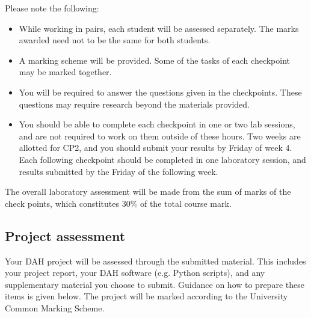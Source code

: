 Please note the following:
\begin{itemize}
\item While working in pairs, each student will be assessed separately. The marks awarded need not to be the same for both students. 
\item A marking scheme will be provided. Some of the tasks of each checkpoint may be marked together.
\item You will be required to answer the questions given in the checkpoints. These questions may require research beyond the materials provided.
\item You should be able to complete each checkpoint in one or two lab sessions, and are not required to work on them outside of these hours. Two weeks are allotted for CP2, and you should submit your results by Friday of week 4. Each following checkpoint should be completed in one laboratory session, and results submitted by the Friday of the following week.
\end{itemize}

The overall laboratory assessment will be made from the sum of marks of the check points, which constitutes 30\% of the total course mark.

\subsection{Project assessment}

Your DAH project will be assessed through the submitted material.
This includes your project report, your DAH software (e.g. Python scripts), and any supplementary material you choose to submit.
Guidance on how to prepare these items is given below.
The project will be marked according to the University Common Marking Scheme. 

\newpage
